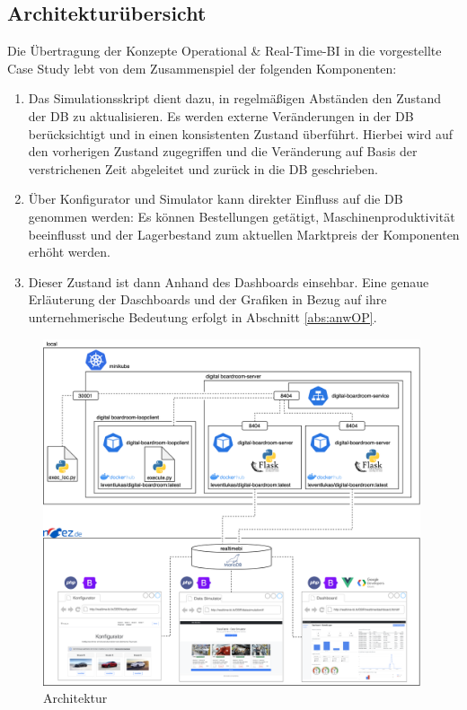 \subsection{Architekturübersicht}
Die Übertragung der Konzepte Operational \& Real-Time-\ac{BI} in die vorgestellte Case Study lebt von dem Zusammenspiel der folgenden Komponenten: 
\begin{enumerate}
    \item Das Simulationsskript dient dazu, in regelmäßigen Abständen den Zustand der \ac{DB} zu aktualisieren. Es werden externe Veränderungen in der \ac{DB} berücksichtigt und in einen konsistenten Zustand überführt. Hierbei wird auf den vorherigen Zustand zugegriffen und die Veränderung auf Basis der verstrichenen Zeit abgeleitet und zurück in die \ac{DB} geschrieben.
    \item Über Konfigurator und Simulator kann direkter Einfluss auf die \ac{DB} genommen werden: Es können Bestellungen getätigt, Maschinenproduktivität beeinflusst und der Lagerbestand zum aktuellen Marktpreis der Komponenten erhöht werden.
    \item Dieser Zustand ist dann Anhand des Dashboards einsehbar. Eine genaue Erläuterung der Daschboards und der Grafiken in Bezug auf ihre unternehmerische Bedeutung erfolgt in Abschnitt \ref{abs:anwOP}.
\end{enumerate}
\begin{figure}[h]
    \centering
    \includegraphics[width=0.99\textwidth]{ausarbeitung-latex/img/Architektur-Vertikal.png}
    \caption{Architektur}
    \label{fig:arch}
\end{figure}
